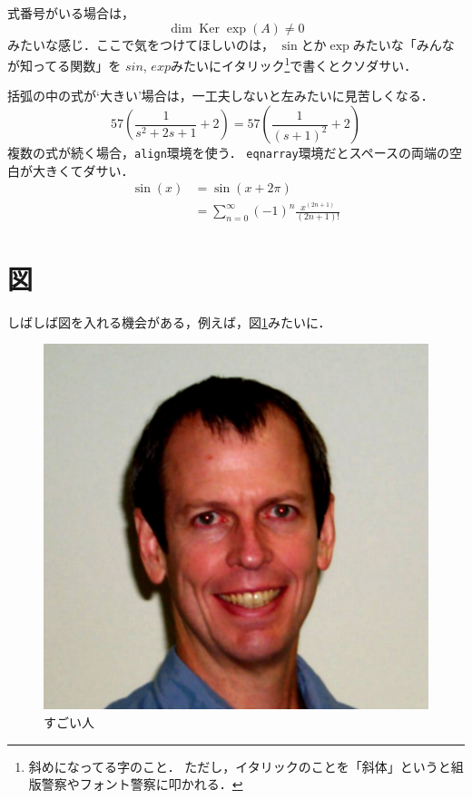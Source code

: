 \documentclass[lualatex,a4paper,ja = standard, twoside, twocolumn]{bxjsarticle}
\begin{document}
  式番号がいる場合は，
    \begin{equation}
      \operatorname{dim}\operatorname{Ker}
        \exp(A) \neq 0
    \end{equation}
  みたいな感じ．ここで気をつけてほしいのは，
  $\sin$とか$\exp$みたいな「みんなが知ってる関数」を
  $sin$, $exp$みたいにイタリック\footnote{斜めになってる字のこと．
    ただし，イタリックのことを「斜体」というと組版警察やフォント警察に叩かれる．}で書くとクソダサい．
  \par 括弧の中の式が`大きい'場合は，一工夫しないと左みたいに見苦しくなる．
    \begin{equation}
      57(\frac{1}{s^2 + 2s + 1} + 2) =57\left(\frac{1}{(s + 1)^2} + 2 \right)
    \end{equation}
  複数の式が続く場合，\texttt{align}環境を使う．
  \texttt{eqnarray}環境だとスペースの両端の空白が大きくてダサい．
    \begin{align}
      \sin(x) &= \sin(x + 2\pi) \\
      &= \sum_{n = 0}^{\infty} (-1)^{n}\frac{x^{(2n + 1)}}{(2n + 1)!}
    \end{align}
\section{図}
  しばしば図を入れる機会がある，例えば，図\ref{pht_doyle}みたいに．
    \begin{figure}[tbp]
      \centering
      \includegraphics[width = 0.95\columnwidth]{figure/doyle_photo.jpg}
      \caption{すごい人} \label{pht_doyle}
    \end{figure}
\end{document}
